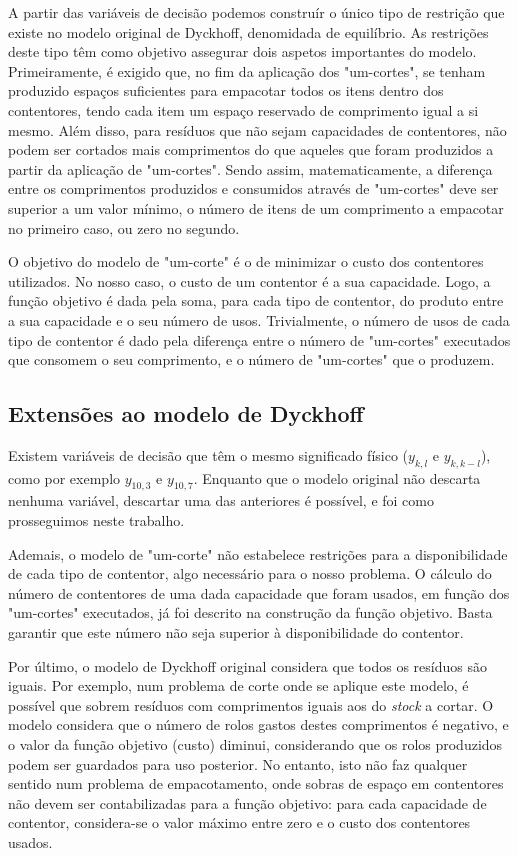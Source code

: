 \documentclass[12pt, a4paper, titlepage]{article}
\begin{document}
A partir das variáveis de decisão podemos construír o único tipo de restrição que existe no modelo
original de Dyckhoff, denomidada de equilíbrio. As restrições deste tipo têm como objetivo assegurar
dois aspetos importantes do modelo. Primeiramente, é exigido que, no fim da aplicação dos
"um-cortes"{}, se tenham produzido espaços suficientes para empacotar todos os itens dentro dos
contentores, tendo cada item um espaço reservado de comprimento igual a si mesmo. Além disso, para
resíduos que não sejam capacidades de contentores, não podem ser cortados mais comprimentos do que
aqueles que foram produzidos a partir da aplicação de "um-cortes". Sendo assim, matematicamente, a
diferença entre os comprimentos produzidos e consumidos através de "um-cortes"{} deve ser superior a
um valor mínimo, o número de itens de um comprimento a empacotar no primeiro caso, ou zero no
segundo.

O objetivo do modelo de "um-corte"{} é o de minimizar o custo dos contentores utilizados. No nosso
caso, o custo de um contentor é a sua capacidade. Logo, a função objetivo é dada pela soma, para
cada tipo de contentor, do produto entre a sua capacidade e o seu número de usos. Trivialmente, o
número de usos de cada tipo de contentor é dado pela diferença entre o número de "um-cortes"{}
executados que consomem o seu comprimento, e o número de "um-cortes"{} que o produzem.

\subsection{Extensões ao modelo de Dyckhoff}

Existem variáveis de decisão que têm o mesmo significado físico ($y_{k, l}$ e $y_{k, k - l}$), como
por exemplo $y_{10,3}$ e $y_{10,7}$. Enquanto que o modelo original não descarta nenhuma variável,
descartar uma das anteriores é possível, e foi como prosseguimos neste trabalho.

Ademais, o modelo de "um-corte"{} não estabelece restrições para a disponibilidade de cada tipo de
contentor, algo necessário para o nosso problema. O cálculo do número de contentores de uma dada
capacidade que foram usados, em função dos "um-cortes"{} executados, já foi descrito na construção
da função objetivo. Basta garantir que este número não seja superior à disponibilidade do contentor.

Por último, o modelo de Dyckhoff original considera que todos os resíduos são iguais. Por exemplo,
num problema de corte onde se aplique este modelo, é possível que sobrem resíduos com comprimentos
iguais aos do \emph{stock} a cortar. O modelo considera que o número de rolos gastos destes
comprimentos é negativo, e o valor da função objetivo (custo) diminui, considerando que os rolos
produzidos podem ser guardados para uso posterior. No entanto, isto não faz qualquer sentido num
problema de empacotamento, onde sobras de espaço em contentores não devem ser contabilizadas para a
função objetivo: para cada capacidade de contentor, considera-se o valor máximo entre zero e o custo
dos contentores usados.
\end{document}
